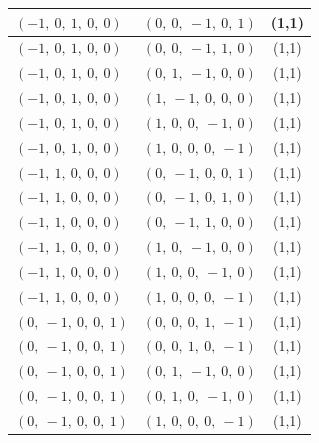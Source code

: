 \documentclass[11pt]{article}
\theoremstyle{definition}
\begin{document}
\begin{longtable}{|l|l|c|}
    \hline
    $\left( -1, \  0, \  1, \  0, \  0\right)$ & $\left( 0, \  0, \  -1, \  0, \  1\right)$ & (1,1) \\
    \hline
    $\left( -1, \  0, \  1, \  0, \  0\right)$ & $\left( 0, \  0, \  -1, \  1, \  0\right)$ & (1,1) \\
    \hline
    $\left( -1, \  0, \  1, \  0, \  0\right)$ & $\left( 0, \  1, \  -1, \  0, \  0\right)$ & (1,1) \\
    \hline
    $\left( -1, \  0, \  1, \  0, \  0\right)$ & $\left( 1, \  -1, \  0, \  0, \  0\right)$ & (1,1) \\
    \hline
    $\left( -1, \  0, \  1, \  0, \  0\right)$ & $\left( 1, \  0, \  0, \  -1, \  0\right)$ & (1,1) \\
    \hline
    $\left( -1, \  0, \  1, \  0, \  0\right)$ & $\left( 1, \  0, \  0, \  0, \  -1\right)$ & (1,1) \\
    \hline
    $\left( -1, \  1, \  0, \  0, \  0\right)$ & $\left( 0, \  -1, \  0, \  0, \  1\right)$ & (1,1) \\
    \hline
    $\left( -1, \  1, \  0, \  0, \  0\right)$ & $\left( 0, \  -1, \  0, \  1, \  0\right)$ & (1,1) \\
    \hline
    $\left( -1, \  1, \  0, \  0, \  0\right)$ & $\left( 0, \  -1, \  1, \  0, \  0\right)$ & (1,1) \\
    \hline
    $\left( -1, \  1, \  0, \  0, \  0\right)$ & $\left( 1, \  0, \  -1, \  0, \  0\right)$ & (1,1) \\
    \hline
    $\left( -1, \  1, \  0, \  0, \  0\right)$ & $\left( 1, \  0, \  0, \  -1, \  0\right)$ & (1,1) \\
    \hline
    $\left( -1, \  1, \  0, \  0, \  0\right)$ & $\left( 1, \  0, \  0, \  0, \  -1\right)$ & (1,1) \\
    \hline
    $\left( 0, \  -1, \  0, \  0, \  1\right)$ & $\left( 0, \  0, \  0, \  1, \  -1\right)$ & (1,1) \\
    \hline
    $\left( 0, \  -1, \  0, \  0, \  1\right)$ & $\left( 0, \  0, \  1, \  0, \  -1\right)$ & (1,1) \\
    \hline
    $\left( 0, \  -1, \  0, \  0, \  1\right)$ & $\left( 0, \  1, \  -1, \  0, \  0\right)$ & (1,1) \\
    \hline
    $\left( 0, \  -1, \  0, \  0, \  1\right)$ & $\left( 0, \  1, \  0, \  -1, \  0\right)$ & (1,1) \\
    \hline
    $\left( 0, \  -1, \  0, \  0, \  1\right)$ & $\left( 1, \  0, \  0, \  0, \  -1\right)$ & (1,1) \\

\end{longtable}
\end{document}
